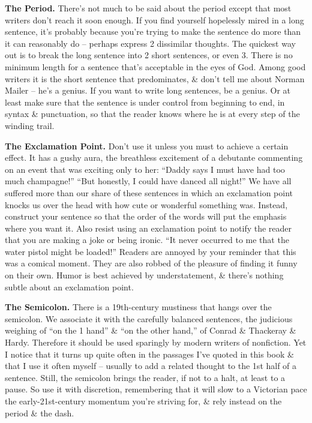 \documentclass{article}
\begin{document}
\textbf{The Period.} There's not much to be said about the period except that most writers don't reach it soon enough. If you find yourself hopelessly mired in a long sentence, it's probably because you're trying to make the sentence do more than it can reasonably do -- perhaps express 2 dissimilar thoughts. The quickest way out is to break the long sentence into 2 short sentences, or even 3. There is no minimum length for a sentence that's acceptable in the eyes of God. Among good writers it is the short sentence that predominates, \& don't tell me about Norman Mailer -- he's a genius. If you want to write long sentences, be a genius. Or at least make sure that the sentence is under control from beginning to end, in syntax \& punctuation, so that the reader knows where he is at every step of the winding trail.

\textbf{The Exclamation Point.} Don't use it unless you must to achieve a certain effect. It has a gushy aura, the breathless excitement of a debutante commenting on an event that was exciting only to her: ``Daddy says I must have had too much champagne!'' ``But honestly, I could have danced all night!'' We have all suffered more than our share of these sentences in which an exclamation point knocks us over the head with how cute or wonderful something was. Instead, construct your sentence so that the order of the words will put the emphasis where you want it. Also resist using an exclamation point to notify the reader that you are making a joke or being ironic. ``It never occurred to me that the water pistol might be loaded!'' Readers are annoyed by your reminder that this was a comical moment. They are also robbed of the pleasure of finding it funny on their own. Humor is best achieved by understatement, \& there's nothing subtle about an exclamation point.

\textbf{The Semicolon.} There is a 19th-century mustiness that hangs over the semicolon. We associate it with the carefully balanced sentences, the judicious weighing of ``on the 1 hand'' \& ``on the other hand,'' of Conrad \& Thackeray \& Hardy. Therefore it should be used sparingly by modern writers of nonfiction. Yet I notice that it turns up quite often in the passages I've quoted in this book \& that I use it often myself -- usually to add a related thought to the 1st half of a sentence. Still, the semicolon brings the reader, if not to a halt, at least to a pause. So use it with discretion, remembering that it will slow to a Victorian pace the early-21st-century momentum you're striving for, \& rely instead on the period \& the dash.
\end{document}
